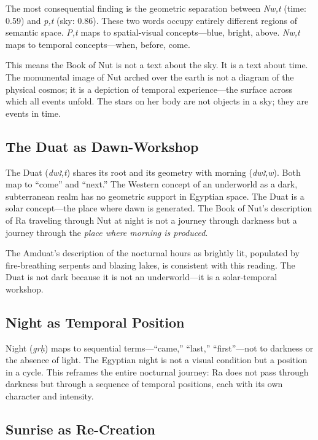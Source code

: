\documentclass[11pt, a4paper]{article}
\begin{document}
The most consequential finding is the geometric separation between \textit{Nw,t} (time: 0.59) and \textit{p,t} (sky: 0.86). These two words occupy entirely different regions of semantic space. \textit{P,t} maps to spatial-visual concepts---blue, bright, above. \textit{Nw,t} maps to temporal concepts---when, before, come.

This means the Book of Nut is not a text about the sky. It is a text about time. The monumental image of Nut arched over the earth is not a diagram of the physical cosmos; it is a depiction of temporal experience---the surface across which all events unfold. The stars on her body are not objects in a sky; they are events in time.

\subsection{The Duat as Dawn-Workshop}

The Duat (\textit{dwꜣ,t}) shares its root and its geometry with morning (\textit{dwꜣ,w}). Both map to ``come'' and ``next.'' The Western concept of an underworld as a dark, subterranean realm has no geometric support in Egyptian space. The Duat is a solar concept---the place where dawn is generated. The Book of Nut's description of Ra traveling through Nut at night is not a journey through darkness but a journey through the \textit{place where morning is produced}.

The Amduat's description of the nocturnal hours as brightly lit, populated by fire-breathing serpents and blazing lakes, is consistent with this reading. The Duat is not dark because it is not an underworld---it is a solar-temporal workshop.

\subsection{Night as Temporal Position}

Night (\textit{grḥ}) maps to sequential terms---``came,'' ``last,'' ``first''---not to darkness or the absence of light. The Egyptian night is not a visual condition but a position in a cycle. This reframes the entire nocturnal journey: Ra does not pass through darkness but through a sequence of temporal positions, each with its own character and intensity.

\subsection{Sunrise as Re-Creation}
\end{document}
